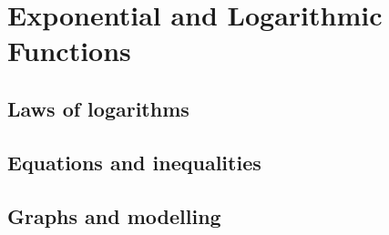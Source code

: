 
\section{Exponential and Logarithmic Functions}

\subsection{Laws of logarithms}


\subsection{Equations and inequalities}


\subsection{Graphs and modelling}

